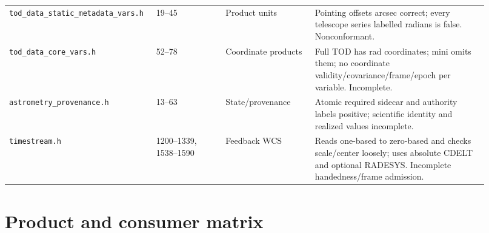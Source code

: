 \documentclass[11pt]{article}
\newcommand{\code}[1]{\nolinkurl{#1}}
\begin{document}
\begin{longtable}{L{0.25\linewidth}L{0.14\linewidth}L{0.18\linewidth}L{0.35\linewidth}}
\code{tod_data_static_metadata_vars.h} & 19--45 & Product units & Pointing offsets arcsec correct; every telescope series labelled radians is false. Nonconformant. \\
\code{tod_data_core_vars.h} & 52--78 & Coordinate products & Full TOD has rad coordinates; mini omits them; no coordinate validity/covariance/frame/epoch per variable. Incomplete. \\
\code{astrometry_provenance.h} & 13--63 & State/provenance & Atomic required sidecar and authority labels positive; scientific identity and realized values incomplete. \\
\code{timestream.h} & 1200--1339, 1538--1590 & Feedback WCS & Reads one-based to zero-based and checks scale/center loosely; uses absolute CDELT and optional RADESYS. Incomplete handedness/frame admission. \\
\bottomrule
\end{longtable}

\section{Product and consumer matrix}
\end{document}
